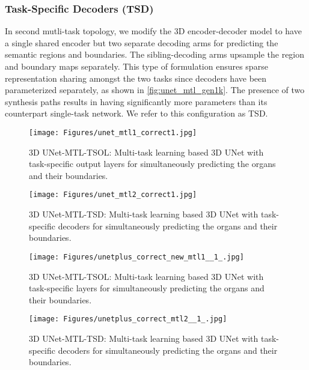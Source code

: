\documentclass[final,5p,times,twocolumn]{elsarticle}
\begin{document}
\subsubsection{Task-Specific Decoders (TSD)}\label{sec:tsd}
In second mutli-task topology, we modify the 3D encoder-decoder model to have a single shared encoder but two separate decoding arms for predicting the semantic regions and boundaries. The sibling-decoding arms upsample the region and boundary maps separately. This type of formulation ensures sparse representation sharing amongst the two tasks since decoders have been parameterized separately, as shown in \autoref{fig:unet_mtl_gen1k}. The presence of two synthesis paths results in having significantly more parameters than its counterpart single-task network. We refer to this configuration as TSD.  
\begin{figure}[!hbt]
\centering
\texttt{[image: Figures/unet\_mtl1\_correct1.jpg]} 
\caption{3D UNet-MTL-TSOL: Multi-task learning based 3D UNet with task-specific output layers for simultaneously predicting the organs and their boundaries.}
\label{fig:unetmtl1}
\end{figure}
\begin{figure}[!hbt]
\centering
\texttt{[image: Figures/unet\_mtl2\_correct1.jpg]} 
\caption{3D UNet-MTL-TSD: Multi-task learning based 3D UNet with task-specific decoders for simultaneously predicting the organs and their boundaries.}
\label{fig:unetmtl2}
\end{figure}
\begin{figure}[!hbt]
\centering
\texttt{[image: Figures/unetplus\_correct\_new\_mtl1\_\_1\_.jpg]} 
\caption{3D UNet-MTL-TSOL: Multi-task learning based 3D UNet with task-specific layers for simultaneously predicting the organs and their boundaries.}
\label{fig:unetplusmtl1}
\end{figure}
\begin{figure}[!hbt]
\centering
\texttt{[image: Figures/unetplus\_correct\_mtl2\_\_1\_.jpg]} 
\caption{3D UNet-MTL-TSD: Multi-task learning based 3D UNet with task-specific decoders for simultaneously predicting the organs and their boundaries.}
\label{fig:unetplusmtl2}
\end{figure}
\end{document}
